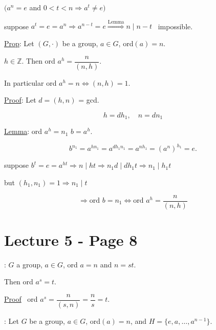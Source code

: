 \bigskip
\begin{center}
$\big(a^n=e$ and $0<t<n \Rightarrow a^t\neq e\big)$
\end{center}

\noindent suppose $a^t=e=a^n \Rightarrow a^{n-t}=e \overset{\text{Lemma}}{\Longrightarrow} n\mid n-t$ \ impossible.

\begin{center}
\end{center}

\bigskip
\noindent\underline{Prop}: Let $(G,\cdot)$ be a group, $a\in G$, ord$(a)=n$.

\noindent $h\in\mathbb{Z}$. Then ord $a^h = \dfrac{n}{(n,h)}$.

\bigskip
\noindent In particular ord $a^h=n \Leftrightarrow (n,h)=1$.

\bigskip
\noindent\underline{Proof}: Let $d=(h,n)$ = gcd.

\[
h=dh_1, \quad n=dn_1
\]

\noindent\underline{Lemma}: ord $a^h = n_1$ \qquad $b=a^h$.

\[
b^{n_1} = a^{hn_1} = a^{dh_1n_1} = a^{nh_1} = (a^n)^{h_1} = e.
\]

\noindent suppose $b^t=e=a^{ht} \Rightarrow n\mid ht \Rightarrow n_1d\mid dh_1t \Rightarrow n_1\mid h_1t$

\noindent but $(h_1,n_1)=1 \Rightarrow n_1\mid t$

\[
\Rightarrow \text{ord } b=n_1 \Leftrightarrow \text{ord } a^h = \frac{n}{(n,h)}
\]



\section*{Lecture 5 - Page 8}


\noindent{}: $G$ a group, $a\in G$, ord $a=n$ and $n=st$.

\noindent Then ord $a^s=t$.

\bigskip
\noindent\underline{Proof} \ ord $a^s = \dfrac{n}{(s,n)} = \dfrac{n}{s} = t$.

\bigskip
\noindent{}: Let $G$ be a group, $a\in G$, ord$(a)=n$, and $H=\{e,a,\ldots,a^{n-1}\}$.

